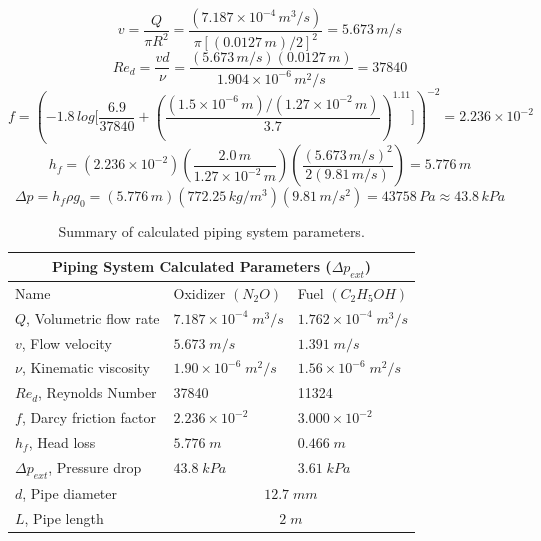 \documentclass[9pt]{article} %
\numberwithin{equation}{section} %
\begin{document}
\begin{equation*}
v = \frac{Q}{\pi R^{2}} = \frac{(7.187 \times 10^{-4}\, m^{3}/s)}{\pi [(0.0127\, m) / 2]^{2}} = 5.673\, m/s
\end{equation*}
\begin{equation*}
Re_{d} = \frac{v d}{\nu} = \frac{(5.673\, m/s)(0.0127\, m)}{1.904 \times 10^{-6}\, m^{2}/s} = 37840
\end{equation*}
\begin{equation*}
f = \left( -1.8\, log \Bigg[ \frac{6.9}{37840} + \left( \frac{(1.5 \times 10^{-6}\, m)/(1.27 \times 10^{-2}\, m)}{3.7} \right) ^{1.11} \Bigg] \right)^{-2} = 2.236 \times 10^{-2}
\end{equation*}
\begin{equation*}
h_{f} = (2.236 \times 10^{-2}) \left( \frac{2.0\, m}{1.27 \times 10^{-2}\, m} \right) \left( \frac{(5.673\, m/s)^{2}}{2 (9.81\, m/s)} \right) = 5.776 \, m
\end{equation*}
\begin{equation*}
\Delta p = h_{f} \rho g_{0} = (5.776 \, m)(772.25 \, kg/m^{3})(9.81 \, m/s^{2}) = 43758 \, Pa \approx 43.8 \, kPa
\end{equation*}

\begin{table}[!htb]
\centering
\begin{tabular}{ |p{6cm}||p{3cm}|p{3cm}| }
\hline
\multicolumn{3}{|c|}{Piping System Calculated Parameters ($\Delta p_{ext}$)} \\
\hline
Name & Oxidizer $(N_{2}O)$ & Fuel $(C_{2}H_{5}OH)$ \\ 
\hline
$Q$, Volumetric flow rate & $7.187 \times 10^{-4} \; m^{3}/s$ & $1.762 \times 10^{-4} \; m^{3}/s$ \\
$v$, Flow velocity & $5.673 \; m/s$ & $1.391 \; m/s$ \\
$\nu$, Kinematic viscosity & $1.90 \times 10^{-6} \; m^{2}/s$ & $1.56 \times 10^{-6} \; m^{2}/s$ \\
$Re_{d}$, Reynolds Number & 37840 & 11324 \\
$f$, Darcy friction factor & $2.236 \times 10^{-2}$ & $3.000 \times 10^{-2}$ \\
$h_{f}$, Head loss & $5.776 \; m$ & $0.466 \; m$ \\
$\Delta p_{ext}$, Pressure drop & $43.8 \; kPa$ & $3.61 \; kPa$ \\
\hline
$d$, Pipe diameter & \multicolumn{2}{|c|}{$12.7 \; mm$}  \\
\hline
$L$, Pipe length & \multicolumn{2}{|c|}{$2 \; m$}  \\
\hline
\end{tabular}
\caption{Summary of calculated piping system parameters.}
\label{table:piping_system_calculated_parameters}
\end{table}
\end{document}
